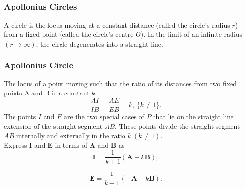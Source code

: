 \documentclass{beamer}
\begin{document}
\subsection{}
\begin{frame}
\frametitle{Apollonius Circles}
A circle is the locus moving at a constant distance (called the circle's radius $r$) from a fixed point (called the circle's centre $O$).
In the limit of an infinite radius $(r\longrightarrow\infty)$, the circle degenerates into a straight line.
\end{frame}
\begin{frame}
\frametitle{Apollonius Circle}
 The locus of a point moving such that the ratio of its distances from two fixed points A and B is a constant $k$.
 \begin{equation}
   \boxed{
   \dfrac{AI}{IB}=\dfrac{AE}{EB}=k,\ \{k\neq1\}.}
   \label{eqn:kratio}
    \end{equation} 
   The points $I$ and $E$ are the two special cases of $P$ that lie on the straight line extension of the straight segment $\overline{AB}$. These points divide the straight segment $\overline{AB}$ internally and externally in the ratio $k\ (k\neq1)$.\\
   
    Express $\boldsymbol{I}$ and $\boldsymbol{E}$ in terms of $\boldsymbol{A}$ and $\boldsymbol{B}$ as 
   \begin{equation}
   \boldsymbol{I} = \dfrac{1}{k+1} (\boldsymbol{A}+k\boldsymbol{B}),
   \label{eqn:ipoint}
   \end{equation}
   
   \begin{equation}
   \boldsymbol{E} = \dfrac{1}{k-1} (-\boldsymbol{A}+k\boldsymbol{B}).
   \label{eqn:epoint}
   \end{equation}   
\end{frame}
\end{document}
